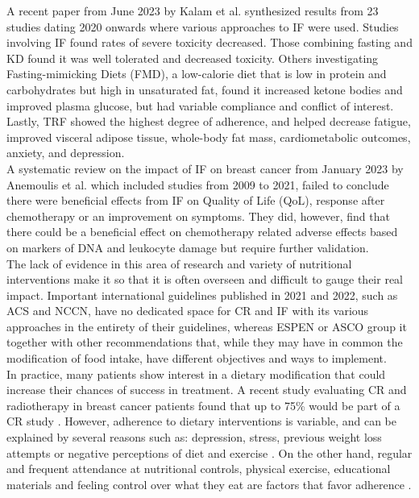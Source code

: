 \documentclass[journal,article,submit,pdftex,moreauthors]{Definitions/mdpi}
\begin{document}
A recent paper from June 2023 by Kalam et al. \cite{kalam2023intermittent} synthesized results from 23 studies dating 2020 onwards where various approaches to IF were used. Studies involving IF found rates of severe toxicity decreased. Those combining fasting and KD found it was well tolerated and decreased toxicity. Others investigating Fasting-mimicking Diets (FMD), a low-calorie diet that is low in protein and carbohydrates but high in unsaturated fat, found it increased ketone bodies and improved plasma glucose, but had variable compliance and conflict of interest. Lastly, TRF showed the highest degree of adherence, and helped decrease fatigue, improved visceral adipose tissue, whole-body fat mass, cardiometabolic outcomes, anxiety, and depression.\\

A systematic review on the impact of IF on breast cancer from January 2023 by Anemoulis et al. \cite{anemoulis2023intermittent} which included studies from 2009 to 2021, failed to conclude there were beneficial effects from IF on Quality of Life (QoL), response after chemotherapy or an improvement on symptoms. They did, however, find that there could be a beneficial effect on chemotherapy related adverse effects based on markers of DNA and leukocyte damage but require further validation. \\

The lack of evidence in this area of research and variety of nutritional interventions make it so that it is often overseen and difficult to gauge their real impact. Important international guidelines published in 2021 and 2022, such as ACS and NCCN, have no dedicated space for {\color{blue}CR and IF with its various approaches} in the entirety of their guidelines, whereas ESPEN or ASCO group it together with other recommendations that, while they may have in common the modification of food intake, have different objectives and ways to implement.\\

In practice, many patients show interest in a dietary modification that could increase their chances of success in treatment. A recent study evaluating CR and radiotherapy in breast cancer patients found that up to 75\% would be part of a CR study \cite{vega2022po}. However, adherence to dietary interventions is variable, and can be explained by several reasons such as: depression, stress, previous weight loss attempts or negative perceptions of diet and exercise \cite{leung2017overview,aycinena2017barriers}. On the other hand, regular and frequent attendance at nutritional controls, physical exercise, educational materials and feeling control over what they eat are factors that favor adherence \cite{dent2020factors, harvey2023barriers}.\\
\end{document}

